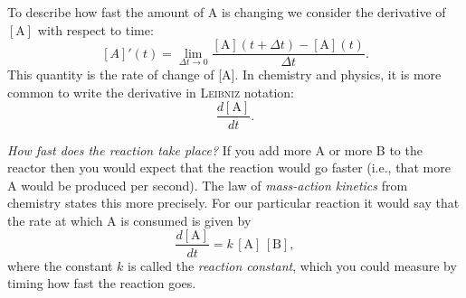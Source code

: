 To describe how fast the amount of A is changing we consider the derivative
of $[\textrm{A}]$ with respect to time:
\[
[A]'(t)= \lim_{\Delta t\to 0}
\frac {[\textrm{A}](t+\Delta t) - [\textrm{A}](t)}  {\Delta t}.
\]
This quantity is the rate of change of [A].  In chemistry and physics, it is
more common to write the derivative in \textsc{Leibniz} notation:
\[
\frac{d[\textrm{A}]}{dt}.
\]

\textit{How fast does the reaction take place?}  If you add more A or more B to
the reactor then you would expect that the reaction would go faster (i.e., that
more A would be produced per second).  The law of \textit{mass-action kinetics}
from chemistry states this more precisely. For our particular reaction it would
say that the rate at which A is consumed is given by
\[
\frac{d[\textrm{A}]}{dt} = k \, [\textrm{A}] \, [\textrm{B}],
\]
where the constant $k$ is called the \textit{reaction constant}, which you could
measure by timing how fast the reaction goes.

